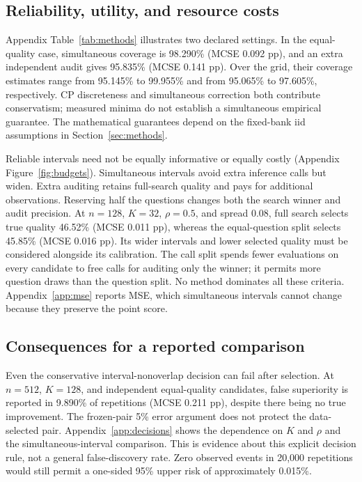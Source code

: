\subsection{Reliability, utility, and resource costs}
Appendix Table~\ref{tab:methods} illustrates two declared settings. In the equal-quality case, simultaneous coverage is 98.290\% (MCSE 0.092 pp), and an extra independent audit gives 95.835\% (MCSE 0.141 pp). Over the grid, their coverage estimates range from 95.145\% to 99.955\% and from 95.065\% to 97.605\%, respectively. CP discreteness and simultaneous correction both contribute conservatism; measured minima do not establish a simultaneous empirical guarantee. The mathematical guarantees depend on the fixed-bank iid assumptions in Section~\ref{sec:methods}.



Reliable intervals need not be equally informative or equally costly (Appendix Figure~\ref{fig:budgets}). Simultaneous intervals avoid extra inference calls but widen. Extra auditing retains full-search quality and pays for additional observations. Reserving half the questions changes both the search winner and audit precision. At $n=128$, $K=32$, $\rho=0.5$, and spread 0.08, full search selects true quality 46.52\% (MCSE 0.011 pp), whereas the equal-question split selects 45.85\% (MCSE 0.016 pp). Its wider intervals and lower selected quality must be considered alongside its calibration. The call split spends fewer evaluations on every candidate to free calls for auditing only the winner; it permits more question draws than the question split. No method dominates all these criteria. Appendix~\ref{app:mse} reports MSE, which simultaneous intervals cannot change because they preserve the point score.



\subsection{Consequences for a reported comparison}
Even the conservative interval-nonoverlap decision can fail after selection. At $n=512$, $K=128$, and independent equal-quality candidates, false superiority is reported in 9.890\% of repetitions (MCSE 0.211 pp), despite there being no true improvement. The frozen-pair 5\% error argument does not protect the data-selected pair. Appendix~\ref{app:decisions} shows the dependence on $K$ and $\rho$ and the simultaneous-interval comparison. This is evidence about this explicit decision rule, not a general false-discovery rate. Zero observed events in 20,000 repetitions would still permit a one-sided 95\% upper risk of approximately 0.015\%.

